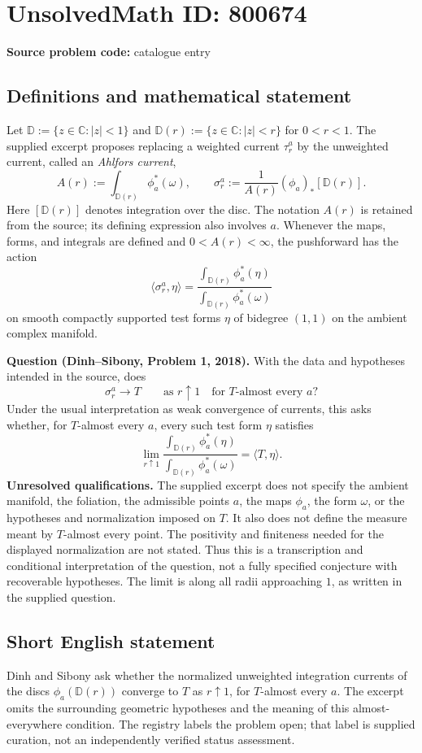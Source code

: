 \documentclass[11pt]{article}
\newcommand{\C}{\mathbb{C}}
\begin{document}
\section*{UnsolvedMath ID: 800674}
\textbf{Source problem code:} catalogue entry
\subsection{Definitions and mathematical statement}
Let \(\mathbb D:=\{z\in\C:|z|<1\}\) and \(\mathbb D(r):=\{z\in\C:|z|<r\}\) for \(0<r<1\). The supplied excerpt proposes replacing a weighted current \(\tau_r^a\) by the unweighted current, called an \emph{Ahlfors current},
\[
 A(r):=\int_{\mathbb D(r)}\phi_a^*(\omega),
 \qquad
 \sigma_r^a:=\frac{1}{A(r)}(\phi_a)_*[\mathbb D(r)].
\]
Here \([\mathbb D(r)]\) denotes integration over the disc. The notation \(A(r)\) is retained from the source; its defining expression also involves \(a\). Whenever the maps, forms, and integrals are defined and \(0<A(r)<\infty\), the pushforward has the action
\[
 \langle\sigma_r^a,\eta\rangle
 =\frac{\displaystyle\int_{\mathbb D(r)}\phi_a^*(\eta)}
 {\displaystyle\int_{\mathbb D(r)}\phi_a^*(\omega)}
\]
on smooth compactly supported test forms \(\eta\) of bidegree \((1,1)\) on the ambient complex manifold.

\textbf{Question (Dinh--Sibony, Problem 1, 2018).} With the data and hypotheses intended in the source, does
\[
 \sigma_r^a\longrightarrow T\qquad\text{as }r\uparrow1
 \quad\text{for }T\text{-almost every }a?
\]
Under the usual interpretation as weak convergence of currents, this asks whether, for \(T\)-almost every \(a\), every such test form \(\eta\) satisfies
\[
 \lim_{r\uparrow1}
 \frac{\displaystyle\int_{\mathbb D(r)}\phi_a^*(\eta)}
 {\displaystyle\int_{\mathbb D(r)}\phi_a^*(\omega)}
 =\langle T,\eta\rangle.
\]
\textbf{Unresolved qualifications.} The supplied excerpt does not specify the ambient manifold, the foliation, the admissible points \(a\), the maps \(\phi_a\), the form \(\omega\), or the hypotheses and normalization imposed on \(T\). It also does not define the measure meant by \(T\)-almost every point. The positivity and finiteness needed for the displayed normalization are not stated. Thus this is a transcription and conditional interpretation of the question, not a fully specified conjecture with recoverable hypotheses. The limit is along all radii approaching \(1\), as written in the supplied question.
\subsection{Short English statement}
Dinh and Sibony ask whether the normalized unweighted integration currents of the discs \(\phi_a(\mathbb D(r))\) converge to \(T\) as \(r\uparrow1\), for \(T\)-almost every \(a\). The excerpt omits the surrounding geometric hypotheses and the meaning of this almost-everywhere condition. The registry labels the problem open; that label is supplied curation, not an independently verified status assessment.
\end{document}
